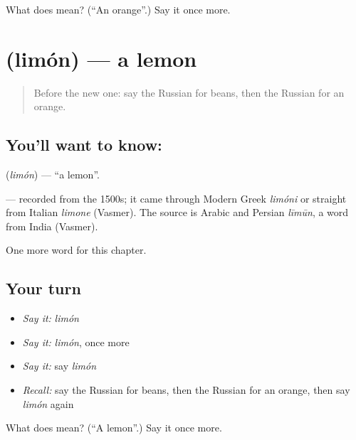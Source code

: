 \begin{tcolorbox}[breakable,colback=teal!4,colframe=teal!35!black,title={Before you move on}]
What does  mean? (\textquotedblleft{}An orange\textquotedblright{}.) Say it once more.
\end{tcolorbox}
\section[\texorpdfstring{\ru{лимон} (limón)}{лимон (limón)}]{ (limón) — a lemon}

\label{lesson:RU-C223-limon}



\begin{quote}
Before the new one: say the Russian for beans, then the Russian for an orange.
\end{quote}

\subsection*{You'll want to know: }
\textbf{} (\emph{limón}) — \textquotedblleft{}a lemon\textquotedblright{}.

\begin{cousinweb}
\textbf{} — recorded from the 1500s; it came through Modern Greek \emph{limóni} or straight from Italian \emph{limone} (Vasmer). The source is Arabic and Persian \emph{līmūn}, a word from India (Vasmer).
\end{cousinweb}

\begin{grammarlens}[title={What you've built}]
One more word for this chapter.
\end{grammarlens}

\subsection*{Your turn}
\begin{itemize}
\raggedright
  \item \emph{Say it:} \emph{limón}
  \item \emph{Say it:} \emph{limón}, once more
  \item \emph{Say it:} say \emph{limón}
  \item \emph{Recall:} say the Russian for beans, then the Russian for an orange, then say \emph{limón} again
\end{itemize}

\begin{tcolorbox}[breakable,colback=teal!4,colframe=teal!35!black,title={Before you move on}]
What does  mean? (\textquotedblleft{}A lemon\textquotedblright{}.) Say it once more.
\end{tcolorbox}

